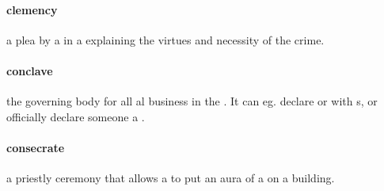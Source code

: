 \paragraph{clemency} a plea by a  in a  explaining the virtues and necessity of the crime.
\paragraph{conclave} the governing body for all al business in the . It can eg. declare  or  with s, or officially declare someone a .
\paragraph{consecrate} a priestly ceremony that allows a  to put an aura of a  on a building.
